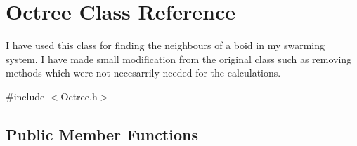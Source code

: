 \hypertarget{classOctree}{\section{Octree Class Reference}
\label{classOctree}
}


I have used this class for finding the neighbours of a boid in my swarming system. I have made small modification from the original class such as removing methods which were not necesarrily needed for the calculations.  




{\ttfamily \#include $<$Octree.\-h$>$}

\subsection*{Public Member Functions}
